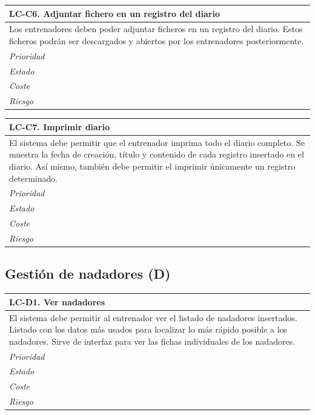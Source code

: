 	\begin{center}
		\begin{tabularx}{15cm}{|X|}
			\hline 
				\bf{LC-C6. Adjuntar fichero en un registro del diario}\\
			\hline
				Los entrenadores deben poder adjuntar ficheros en un registro del diario. Estos ficheros podrán ser descargados y abiertos por los entrenadores posteriormente.\\
			\hline
				\it{Prioridad}\\
			\hline
				\it{Estado}\\
			\hline
				\it{Coste}\\
			\hline
				\it{Riesgo}\\
			\hline
		\end{tabularx}
	\end{center}
	
	\begin{center}
		\begin{tabularx}{15cm}{|X|}
			\hline 
				\bf{LC-C7. Imprimir diario}\\
			\hline
				El sistema debe permitir que el entrenador imprima todo el diario completo. Se muestra la fecha de creación, título y contenido de cada registro insertado en el diario. Así mismo, también debe permitir el imprimir únicamente un registro determinado.\\
			\hline
				\it{Prioridad}\\
			\hline
				\it{Estado}\\
			\hline
				\it{Coste}\\
			\hline
				\it{Riesgo}\\
			\hline
		\end{tabularx}
	\end{center}


% 
%
\subsection{Gestión de nadadores (D)} %
	\label{sub:gestion_de_nadadores}
	
	\begin{center}
		\begin{tabularx}{15cm}{|X|}
			\hline 
				\bf{LC-D1. Ver nadadores}\\
			\hline
				El sistema debe permitir al entrenador ver el listado de nadadores insertados. Listado con los datos más usados para localizar lo más rápido posible a los nadadores. Sirve de interfaz para ver las fichas individuales de los nadadores.\\
			\hline
				\it{Prioridad}\\
			\hline
				\it{Estado}\\
			\hline
				\it{Coste}\\
			\hline
				\it{Riesgo}\\
			\hline
		\end{tabularx}
	\end{center}
	
